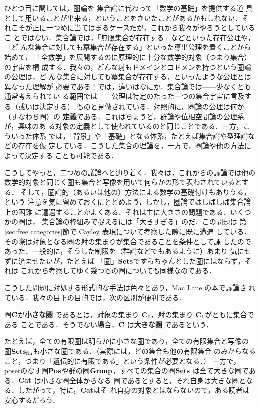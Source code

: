ひとつ目に関しては，圏論を
集合論に代わって「数学の基礎」を提供する道
具として用いることが出来る，ということをきいたことがあるかもしれない．そ
れこそが正に一つめに当てはまるケースだが，これから我々がやろうとしているこ
とではない．集合論では，「無限集合が存在する」などといった存在公理や，「ど
んな集合に対しても冪集合が存在する」といった導出公理を置くことから始めて，
「全数学」を展開するのに原理的に十分な数学的対象（つまり集合）の宇宙を構
成する．我々の，どんな射もドメインとコドメンを持つという圏論の公理は，ど
んな集合に対しても冪集合が存在する，といったような公理とは異なった理解が
必要である！では，違いはなにか．集合論では——少なくとも通常考えられてい
る範囲では——公理は特定のたった一つの集合宇宙に言及する（或いは決定する）
ものと見做されている．対照的に，圏論の公理は何か（すなわち圏）の
{\bfseries 定義}である．これはちょうど，群論や位相空間論の公理系が，興味のあ
る対象の定義として使われているのと同じことである．一方，こういった体系
では，「背景」や「基礎」となる体系，たとえば集合論や型理論などの存在を仮
定している．こうした集合の理論を，一方で，圏論や他の方法によって決定する
ことも可能である．

こうしてやっと，二つめの議論へと辿り着く．我々は，これからの議論では他の
数学的対象と同じく圏も集合と写像を用いて何らかの形で表わされているとする．
そして，圏論的（あるいは他の）方法による数学の基礎付けもありうる，という
注意を気に留めておくにとどめよう．しかし，圏論ではしばしば集合論上の困難
に遭遇することがよくある．それは主に大きさの問題である．いくつかの圏は，
集合論の枠組みで捉えるには「大きすぎる」のだ．この問題は
第\ref{sec:free categories}節で Cayley 表現について考察した際に既に遭遇
している．その際は対象となる圏の射の集まりが集合であることを条件として課
したのであった．一般的に，そうした制限を（群論などでもあるように）あまり
気にせずに済ませたいが，たとえば
「圏」$\mathbf{Sets}$ですらちゃんとした圏にはならず，それは
これから考察してゆく幾つもの圏についても同様なのである．

こうした問題に対処する形式的な手法は色々とあり，Mac Lane の本で議論さ
れている．我々の目下の目的では，次の区別が便利である．

\begin{definition}
 圏${\bf C}$が{\bfseries 小さな圏}
 であるとは，対象の集まり
 ${\bf C}_0$，射の集まり ${\bf C}_1$がともに集合である
 ことである．そうでない場合，${\bf C}$ は{\bfseries 大きな圏}
 であるという．
\end{definition}
たとえば，全ての有限圏は明らかに小さな圏であり，全ての有限集合と写像の
圏$\mathbf{Sets}_{\rm fin}$も小さな圏である．（実際には，どの集合も他の有限集合
のみからなること，つまり「遺伝的に有限である」という条件が必要となる．）
一方で，posetのなす圏$\mathbf{Pos}$や群の圏${\bf Group}$，すべての集合の圏$\mathbf{Sets}$
は全て大きな圏である．$\mathbf{Cat}$ は小さな圏全体からなる
圏であるとすると，それ自身は大きな圏となる．したがって，特に，$\mathbf{Cat}$はそ
れ自身の対象とはならないので，ある読者は安心するだろう．

